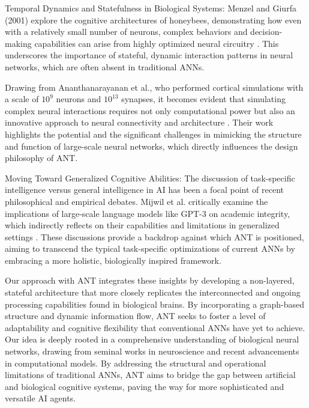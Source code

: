 \documentclass{article}
\begin{document}
\begin{multicols}{2}
        Temporal Dynamics and Statefulness in Biological Systems: Menzel and Giurfa (2001) explore the cognitive architectures of honeybees, demonstrating how even with a relatively small number of neurons, complex behaviors and decision-making capabilities can arise from highly optimized neural circuitry \cite{menzel2001}. This underscores the importance of stateful, dynamic interaction patterns in neural networks, which are often absent in traditional ANNs.
        
        Drawing from Ananthanarayanan et al., who performed cortical simulations with a scale of $10^{9}$ neurons and $10^{13}$ synapses, it becomes evident that simulating complex neural interactions requires not only computational power but also an innovative approach to neural connectivity and architecture \cite{ananth2009}. Their work highlights the potential and the significant challenges in mimicking the structure and function of large-scale neural networks, which directly influences the design philosophy of ANT.
        
        Moving Toward Generalized Cognitive Abilities: The discussion of task-specific intelligence versus general intelligence in AI has been a focal point of recent philosophical and empirical debates. Mijwil et al. critically examine the implications of large-scale language models like GPT-3 on academic integrity, which indirectly reflects on their capabilities and limitations in generalized settings \cite{mijwil2023}. These discussions provide a backdrop against which ANT is positioned, aiming to transcend the typical task-specific optimizations of current ANNs by embracing a more holistic, biologically inspired framework.
        
        Our approach with ANT integrates these insights by developing a non-layered, stateful architecture that more closely replicates the interconnected and ongoing processing capabilities found in biological brains. By incorporating a graph-based structure and dynamic information flow, ANT seeks to foster a level of adaptability and cognitive flexibility that conventional ANNs have yet to achieve. Our idea is deeply rooted in a comprehensive understanding of biological neural networks, drawing from seminal works in neuroscience and recent advancements in computational models. By addressing the structural and operational limitations of traditional ANNs, ANT aims to bridge the gap between artificial and biological cognitive systems, paving the way for more sophisticated and versatile AI agents.
	

\end{multicols}
\end{document}
